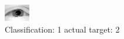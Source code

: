 \begin{figure}[h!]
\begin{center}
\includegraphics[width=0.60\columnwidth]{figures/ID2308_class_1_target_2.png}
\end{center}
\caption{ Classification: 1 actual target: 2}
\label{fig:ID2308_class_1_target_2}
\end{figure}
